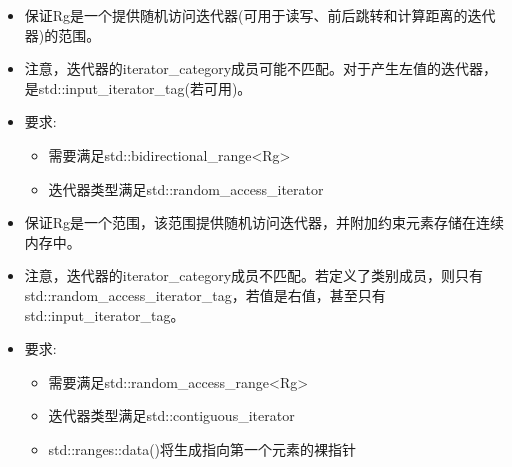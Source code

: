 
\begin{itemize}
\item
保证Rg是一个提供随机访问迭代器(可用于读写、前后跳转和计算距离的迭代器)的范围。

\item
注意，迭代器的iterator\_category成员可能不匹配。对于产生左值的迭代器，是std::input\_iterator\_tag(若可用)。

\item
要求:

\begin{itemize}
\item
需要满足std::bidirectional\_range<Rg>

\item
迭代器类型满足std::random\_access\_iterator
\end{itemize}
\end{itemize}


\begin{itemize}
\item
保证Rg是一个范围，该范围提供随机访问迭代器，并附加约束元素存储在连续内存中。

\item
注意，迭代器的iterator\_category成员不匹配。若定义了类别成员，则只有std::random\_access\_iterator\_tag，若值是右值，甚至只有std::input\_iterator\_tag。

\item
要求:

\begin{itemize}
\item
需要满足std::random\_access\_range<Rg>

\item
迭代器类型满足std::contiguous\_iterator

\item
std::ranges::data()将生成指向第一个元素的裸指针
\end{itemize}
\end{itemize}


